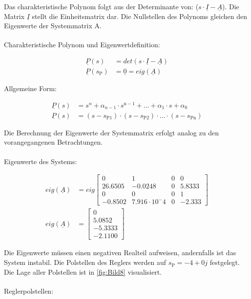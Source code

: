 Das charakteristische Polynom folgt aus der Determinante von: ($s\cdot\underline{I}-\underline{A}$). Die Matrix $\underline{I}$ stellt die Einheitsmatrix dar. Die Nullstellen des Polynoms gleichen den Eigenwerte der Systemmatrix A.\\\\
Charakteristische Polynom und Eigenwertdefinition:

\begin{align*}
    \underline{P}(s) &= det(s\cdot\underline{I}-\underline{A}) \\
    \underline{P}(s_{\mathrm{P}}) &= \underline{0} = eig(\underline{A})
\end{align*}

Allgemeine Form:

\begin{align*}
        \underline{P}(s) &= s^n+\alpha_{n-1}\cdot s^{\mathrm{n-1}}+...+\alpha_{\mathrm{1}}\cdot s + \alpha_{\mathrm{0}} \\
        \underline{P}(s) &= (s-s_{\mathrm{P1}})\cdot(s-s_{\mathrm{P2}})\cdot ... \cdot (s-s_{\mathrm{Pn}})
\end{align*}

Die Berechnung der Eigenwerte der Systemmatrix erfolgt analog zu den vorangegangenen Betrachtungen.\\\\
Eigenwerte des Systems:

\begin{align}\label{eq:Gleichung36}
    eig(\underline{A}) &= eig
    \begin{bmatrix}
        0 & 1 & 0 & 0 \\
        26.6505 & -0.0248 & 0 & 5.8333 \\
        0 & 0 & 0 & 1 \\
        -0.8502 & 7.916\cdot10^-4 & 0 & -2.333
    \end{bmatrix} \nonumber\\
    eig(\underline{A}) &=
    \begin{bmatrix}
        0 \\
        5.0852 \\
        -5.3333 \\
        -2.1100
    \end{bmatrix}
\end{align}

Die Eigenwerte müssen einen negativen Realteil aufweisen, andernfalls ist das System instabil. Die Polstellen des Reglers werden auf $s_{\mathrm{P}} = -4+0j$ festgelegt. Die Lage aller Polstellen ist in \autoref{fig:Bild8} visualisiert.\\\\
Reglerpolstellen:

